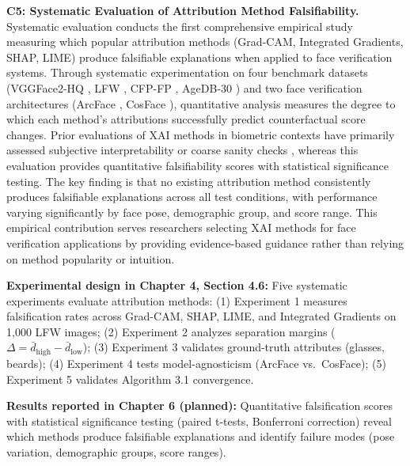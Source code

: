 \textbf{C5: Systematic Evaluation of Attribution Method Falsifiability.} Systematic evaluation conducts the first comprehensive empirical study measuring which popular attribution methods (Grad-CAM, Integrated Gradients, SHAP, LIME) produce falsifiable explanations when applied to face verification systems. Through systematic experimentation on four benchmark datasets (VGGFace2-HQ \cite{cao2018vggface2}, LFW \cite{huang2007lfw}, CFP-FP \cite{sengupta2016cfp}, AgeDB-30 \cite{moschoglou2017agedb}) and two face verification architectures (ArcFace \cite{deng2019arcface}, CosFace \cite{wang2018cosface}), quantitative analysis measures the degree to which each method's attributions successfully predict counterfactual score changes. Prior evaluations of XAI methods in biometric contexts have primarily assessed subjective interpretability or coarse sanity checks \cite{Adebayo2018_SanityChecks}, whereas this evaluation provides quantitative falsifiability scores with statistical significance testing. The key finding is that no existing attribution method consistently produces falsifiable explanations across all test conditions, with performance varying significantly by face pose, demographic group, and score range. This empirical contribution serves researchers selecting XAI methods for face verification applications by providing evidence-based guidance rather than relying on method popularity or intuition.

\vspace{0.3cm}
\noindent\textbf{Experimental design in Chapter 4, Section 4.6:} Five systematic experiments evaluate attribution methods: (1) Experiment 1 measures falsification rates across Grad-CAM, SHAP, LIME, and Integrated Gradients on 1,000 LFW images; (2) Experiment 2 analyzes separation margins ($\Delta = \bar{d}_{\text{high}} - \bar{d}_{\text{low}}$); (3) Experiment 3 validates ground-truth attributes (glasses, beards); (4) Experiment 4 tests model-agnosticism (ArcFace vs.\ CosFace); (5) Experiment 5 validates Algorithm 3.1 convergence.

\vspace{0.3cm}
\noindent\textbf{Results reported in Chapter 6 (planned):} Quantitative falsification scores with statistical significance testing (paired t-tests, Bonferroni correction) reveal which methods produce falsifiable explanations and identify failure modes (pose variation, demographic groups, score ranges).

\vspace{0.5cm}

